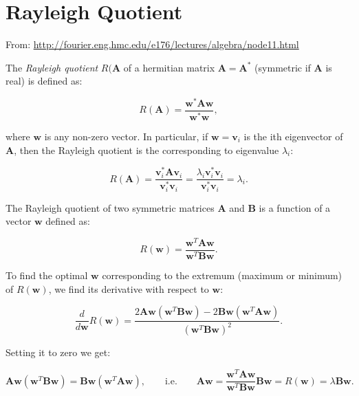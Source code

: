 \documentclass[10pt,b5paper,titlepage]{book}
\begin{document}
\chapter{Rayleigh Quotient}

From: \url{http://fourier.eng.hmc.edu/e176/lectures/algebra/node11.html}

The \textit{Rayleigh quotient} $R(\mathbf{A}$ of a hermitian matrix
$\mathbf{A} = \mathbf{A}^{*}$ (symmetric if $\mathbf{A}$ is real) is defined as:

\begin{equation}
    R(\mathbf{A}) = \frac{\mathbf{w}^{*}\mathbf{A}\mathbf{w}}{\mathbf{w}^{*}\mathbf{w}}
,\end{equation}

where $\mathbf{w}$ is any non-zero vector. In particular, if $\mathbf{w} = \mathbf{v}_{i}$
is the ith eigenvector of $\mathbf{A}$, then the Rayleigh quotient is the corresponding
to eigenvalue $\lambda_{i}$:

\begin{equation}
    R(\mathbf{A}) = \frac{\mathbf{v}_{i}^{*}\mathbf{A}\mathbf{v}_{i}}
    {\mathbf{v}_{i}^{*}\mathbf{v}_{i}}
    = \frac{\lambda_{i}\mathbf{v}_{i}^{*}\mathbf{v}_{i}}
    {\mathbf{v}_{i}^{*}\mathbf{v}_{i}}
    = \lambda_{i}
.\end{equation}

The Rayleigh quotient of two symmetric matrices $\mathbf{A}$ and $\mathbf{B}$
is a function of a vector $\mathbf{w}$ defined as:

\begin{equation}
    R(\mathbf{w}) = \frac{\mathbf{w}^{T}\mathbf{A}\mathbf{w}}
    {\mathbf{w}^{T}\mathbf{B}\mathbf{w}}
.\end{equation}

To find the optimal $\mathbf{w}$ corresponding to the extremum (maximum or minimum)
of $R(\mathbf{w})$, we find its derivative with respect to $\mathbf{w}$:

\begin{equation}
    \frac{d}{d \mathbf{w}}R(\mathbf{w}) =
    \frac{2 \mathbf{A}\mathbf{w}(\mathbf{w}^{T}\mathbf{B}\mathbf{w})
    - 2 \mathbf{B}\mathbf{w}(\mathbf{w}^{T}\mathbf{A}\mathbf{w})}
    {(\mathbf{w}^{T}\mathbf{B}\mathbf{w})^{2}}
.\end{equation}

Setting it to zero we get:

\begin{equation}
    \mathbf{A}\mathbf{w}(\mathbf{w}^{T}\mathbf{B}\mathbf{w})
    = \mathbf{B}\mathbf{w}(\mathbf{w}^{T}\mathbf{A}\mathbf{w})
    , \qquad \text{i.e.}\qquad
    \mathbf{A}\mathbf{w} =
    \frac{\mathbf{w}^{T}\mathbf{A}\mathbf{w}}
    {\mathbf{w}^{T}\mathbf{B}\mathbf{w}}\mathbf{B}\mathbf{w}
    = R(\mathbf{w}) = \lambda \mathbf{B}\mathbf{w}
.\end{equation}
\end{document}
